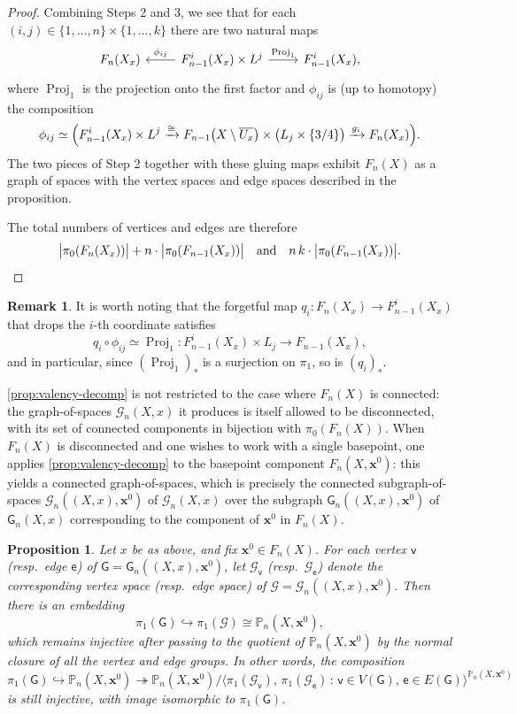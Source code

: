 \documentclass[reqno]{amsart}
\newtheorem{proposition}[theorem]{Proposition}
\theoremstyle{definition}
\newtheorem{remark}[theorem]{Remark}
\newcommand\bfx{\mathbf{x}}
\newcommand\cG{\mathcal{G}}
\newcommand\sfG{\mathsf{G}}
\newcommand\sfe{\mathsf{e}}
\newcommand\sfv{\mathsf{v}}
\newcommand{\PB}{\mathbb{P}}
\newcommand{\co}[1]{\mathopen{\langle}#1\mathclose{\rangle}} %
\newcommand{\base}{\bfx^0}
\DeclareMathOperator{\proj}{Proj}
\numberwithin{equation}{section}
\begin{document}
\begin{proof}
Combining Steps 2 and 3, we see that for each
\((i,j)\in\{1,\dots,n\}\times\{1,\dots,k\}\) there are two natural
maps
\[
\begin{tikzcd}
F_n(X_x) &
F_{n-1}^i(X_x)\times L^j
  \arrow[l, "\phi_{ij}"']
  \arrow[r, "\proj_1"]
& F_{n-1}^i(X_x),
\end{tikzcd}
\]
where \(\proj_1\) is the projection onto the first
factor and \(\phi_{ij}\) is (up to homotopy) the composition
\[
\phi_{ij} \simeq
\Bigl(
F_{n-1}^i(X_x)\times L^j
\xrightarrow{\cong}
F_{n-1}\bigl(X\setminus \overline{U_x}\bigr)\times \bigl(L_j\times\{3/4\}\bigr)
\xrightarrow{g_i}
F_n(X_x)
\Bigr).
\]
The two pieces of Step 2 together with these gluing maps exhibit
\(F_n(X)\) as a graph of spaces with the vertex spaces and edge
spaces described in the proposition.


The total numbers of vertices and edges are therefore
\[
\bigl|\pi_0(F_n(X_x))\bigr|+n\cdot \bigl|\pi_0(F_{n-1}(X_x))\bigr|\quad\text{and}\quad
n\,k \cdot \bigl|\pi_0(F_{n-1}(X_x))\bigr|.\qedhere
\]
\end{proof}

\begin{remark}\label{rem:forgetful_map}
It is worth noting that the forgetful map
\(q_i\colon F_n(X_x)\to F_{n-1}^i(X_x)\) that drops the \(i\)-th
coordinate satisfies
\[
q_i\circ \phi_{ij} \simeq \proj_1:F^i_{n-1}(X_x)\times L_j\to F_{n-1}(X_x),
\]
and in particular, since \((\proj_1)_\ast\) is a
surjection on \(\pi_1\), so is \((q_i)_\ast\).
\end{remark}

\cref{prop:valency-decomp} is not restricted to the
case where \(F_n(X)\) is connected: the graph-of-spaces
\(\cG_n(X,x)\) it produces is itself allowed to be disconnected,
with its set of connected components in bijection with
\(\pi_0(F_n(X))\). When \(F_n(X)\) is disconnected and one wishes to
work with a single basepoint, one applies
\cref{prop:valency-decomp} to the basepoint component
\(F_n(X,\base)\): this yields a connected graph-of-spaces, which is precisely the connected
subgraph-of-spaces \(\cG_n((X,x),\base)\) of \(\cG_n(X,x)\) over the subgraph \(\sfG_n((X,x),\base)\) of \(\sfG_n(X,x)\) corresponding to the
component of \(\base\) in \(F_n(X)\). 


\begin{proposition}\label{prop:pi1G-embedding}
Let \(x\) be as above, and fix \(\base\in F_n(X)\). For each
vertex \(\sfv\) (resp.\ edge \(\sfe\)) of \(\sfG=\sfG_n((X,x),\base)\), let
\(\cG_\sfv\) (resp.\ \(\cG_\sfe\)) denote the corresponding vertex space
(resp.\ edge space) of \(\cG=\cG_n((X,x),\base)\). Then there is
an embedding
\[
\pi_1(\sfG) \hookrightarrow
\pi_1(\cG)
\cong\PB_n(X,\base),
\]
which remains injective after passing to the quotient of
\(\PB_n(X,\base)\) by the normal closure of all the vertex and
edge groups. In other words, the composition
\[
\pi_1(\sfG)\hookrightarrow \PB_n(X,\base)
\twoheadrightarrow
\PB_n(X,\base)\Big/\co{\pi_1(\cG_\sfv),\,\pi_1(\cG_\sfe)
\,:\,\sfv\in V(\sfG),\,\sfe\in E(\sfG)}^{\PB_n(X,\base)}
\]
is still injective, with image isomorphic to
\(\pi_1(\sfG)\).
\end{proposition}
\end{document}
